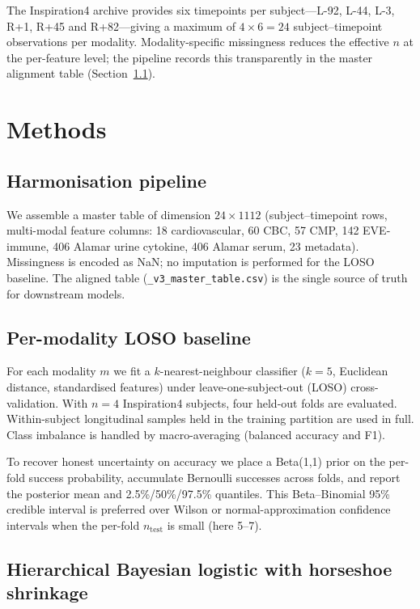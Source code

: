 \documentclass[11pt,a4paper,3p,authoryear]{elsarticle}
\begin{document}
The Inspiration4 archive provides six timepoints per subject---\mbox{L-92}, \mbox{L-44}, \mbox{L-3}, \mbox{R+1}, \mbox{R+45} and \mbox{R+82}---giving a maximum of $4 \times 6 = 24$ subject--timepoint observations per modality. Modality-specific missingness reduces the effective $n$ at the per-feature level; the pipeline records this transparently in the master alignment table (Section~\ref{sec:methods-harmonisation}).

\section{Methods}\label{sec:methods}

\subsection{Harmonisation pipeline}\label{sec:methods-harmonisation}

We assemble a master table of dimension $24 \times 1112$ (subject--timepoint rows, multi-modal feature columns: 18 cardiovascular, 60 CBC, 57 CMP, 142 EVE-immune, 406 Alamar urine cytokine, 406 Alamar serum, 23 metadata). Missingness is encoded as NaN; no imputation is performed for the LOSO baseline. The aligned table (\texttt{\_v3\_master\_table.csv}) is the single source of truth for downstream models.

\subsection{Per-modality LOSO baseline}\label{sec:methods-loso}

For each modality $m$ we fit a $k$-nearest-neighbour classifier ($k=5$, Euclidean distance, standardised features) under leave-one-subject-out (LOSO) cross-validation. With $n=4$ Inspiration4 subjects, four held-out folds are evaluated. Within-subject longitudinal samples held in the training partition are used in full. Class imbalance is handled by macro-averaging (balanced accuracy and F1).

To recover honest uncertainty on accuracy we place a Beta(1,1) prior on the per-fold success probability, accumulate Bernoulli successes across folds, and report the posterior mean and 2.5\%/50\%/97.5\% quantiles. This Beta--Binomial 95\% credible interval is preferred over Wilson or normal-approximation confidence intervals when the per-fold $n_\mathrm{test}$ is small (here 5--7).

\subsection{Hierarchical Bayesian logistic with horseshoe shrinkage}\label{sec:methods-bayes}
\end{document}
